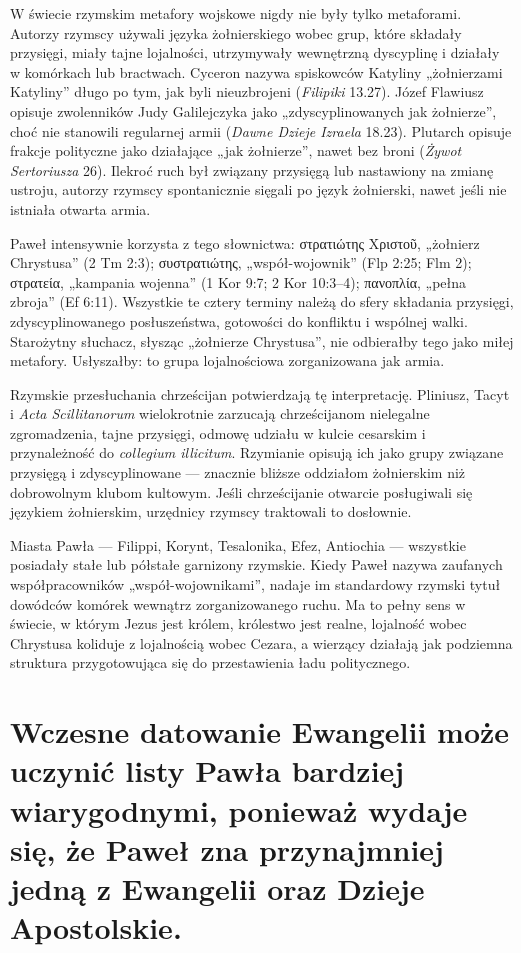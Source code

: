 W świecie rzymskim metafory wojskowe nigdy nie były tylko metaforami.
Autorzy rzymscy używali języka żołnierskiego wobec grup, które składały przysięgi, miały tajne lojalności, utrzymywały wewnętrzną dyscyplinę i działały w komórkach lub bractwach.
Cyceron nazywa spiskowców Katyliny „żołnierzami Katyliny” długo po tym, jak byli nieuzbrojeni (\emph{Filipiki} 13.27).
Józef Flawiusz opisuje zwolenników Judy Galilejczyka jako „zdyscyplinowanych jak żołnierze”, choć nie stanowili regularnej armii (\emph{Dawne Dzieje Izraela} 18.23).
Plutarch opisuje frakcje polityczne jako działające „jak żołnierze”, nawet bez broni (\emph{Żywot Sertoriusza} 26).
Ilekroć ruch był związany przysięgą lub nastawiony na zmianę ustroju, autorzy rzymscy spontanicznie sięgali po język żołnierski, nawet jeśli nie istniała otwarta armia.

Paweł intensywnie korzysta z tego słownictwa: στρατιώτης Χριστοῦ, „żołnierz Chrystusa” (2 Tm 2:3); συστρατιώτης, „współ-wojownik” (Flp 2:25; Flm 2); στρατεία, „kampania wojenna” (1 Kor 9:7; 2 Kor 10:3–4); πανοπλία, „pełna zbroja” (Ef 6:11).
Wszystkie te cztery terminy należą do sfery składania przysięgi, zdyscyplinowanego posłuszeństwa, gotowości do konfliktu i wspólnej walki.
Starożytny słuchacz, słysząc „żołnierze Chrystusa”, nie odbierałby tego jako miłej metafory.
Usłyszałby: to grupa lojalnościowa zorganizowana jak armia.

Rzymskie przesłuchania chrześcijan potwierdzają tę interpretację.
Pliniusz, Tacyt i \emph{Acta Scillitanorum} wielokrotnie zarzucają chrześcijanom nielegalne zgromadzenia, tajne przysięgi, odmowę udziału w kulcie cesarskim i przynależność do \emph{collegium illicitum}.
Rzymianie opisują ich jako grupy związane przysięgą i zdyscyplinowane — znacznie bliższe oddziałom żołnierskim niż dobrowolnym klubom kultowym.
Jeśli chrześcijanie otwarcie posługiwali się językiem żołnierskim, urzędnicy rzymscy traktowali to dosłownie.

Miasta Pawła — Filippi, Korynt, Tesalonika, Efez, Antiochia — wszystkie posiadały stałe lub półstałe garnizony rzymskie.
Kiedy Paweł nazywa zaufanych współpracowników „współ-wojownikami”, nadaje im standardowy rzymski tytuł dowódców komórek wewnątrz zorganizowanego ruchu.
Ma to pełny sens w świecie, w którym Jezus jest królem, królestwo jest realne, lojalność wobec Chrystusa koliduje z lojalnością wobec Cezara, a wierzący działają jak podziemna struktura przygotowująca się do przestawienia ładu politycznego.

\section{Wczesne datowanie Ewangelii może uczynić listy Pawła bardziej wiarygodnymi, ponieważ wydaje się, że Paweł zna przynajmniej jedną z Ewangelii oraz Dzieje Apostolskie.}\label{sec:the-early-dating-of-the-gospels-can-make-the-letters-of-paul-more-plausible-as-it-seems-paul-already-has-the-knowledge-of-at-least-one-of-the-gospels-and-the-acts.}

